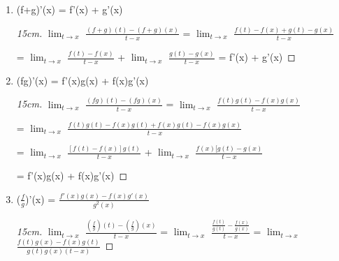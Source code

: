     \begin{enumerate}[label=(\alph*), leftmargin=2cm, itemsep=0.1cm]
        \item (f+g)'(x) = f'(x) + g'(x)
        
            \begin{proof}[15cm]
                $\lim_{t \rightarrow x}$ $\frac{(f+g)(t) - (f+g)(x)}{t - x}$
                = $\lim_{t \rightarrow x}$ $\frac{f(t) - f(x) + g(t) - g(x)}{t - x}$
                
                \hspace{4cm}
                = $\lim_{t \rightarrow x}$ $\frac{f(t) - f(x)}{t - x}$
                + $\lim_{t \rightarrow x}$ $\frac{g(t) - g(x)}{t - x}$
                = f'(x) + g'(x)
            \end{proof}
        
        \item (fg)'(x) = f'(x)g(x) + f(x)g'(x)

            \begin{proof}[15cm]
                $\lim_{t \rightarrow x}$ $\frac{(fg)(t) - (fg)(x)}{t - x}$
                = $\lim_{t \rightarrow x}$ $\frac{f(t)g(t) - f(x)g(x)}{t - x}$

                \hspace{3.5cm}
                = $\lim_{t \rightarrow x}$ $\frac{f(t)g(t)-f(x)g(t)+f(x)g(t)-f(x)g(x)}
                                                {t - x}$
                
                \hspace{3.5cm}
                = $\lim_{t \rightarrow x}$ $\frac{[f(t)-f(x)]g(t)}{t - x}$
                + $\lim_{t \rightarrow x}$ $\frac{f(x)[g(t)-g(x)}{t - x}$
                
                \hspace{3.5cm}
                = f'(x)g(x) + f(x)g'(x)
            \end{proof}

        \item ($\frac{f}{g}$)'(x) = $\frac{f'(x)g(x) - f(x)g'(x)}{g^2(x)}$
        
            \begin{proof}[15cm]
                $\lim_{t \rightarrow x}$ $\frac{(\frac{f}{g})(t)
                                                - (\frac{f}{g})(x)}{t - x}$
                = $\lim_{t \rightarrow x}$ $\frac{\frac{f(t)}{g(t)}
                                                - \frac{f(x)}{g(x)}}{t - x}$
                = $\lim_{t \rightarrow x}$ $\frac{f(t)g(x) - f(x)g(t)}
                                                    {g(t)g(x)(t-x)}$
                

\end{proof}
\end{enumerate}
